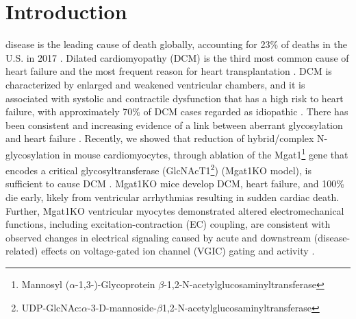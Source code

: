 \documentclass[journal]{IEEEtran}
\begin{document}
%
\IEEEpeerreviewmaketitle

\section{Introduction}
 disease is the leading cause of death globally, accounting for 23\% of deaths in the U.S. in 2017 \cite{cdc2019deaths}. Dilated cardiomyopathy (DCM) is the third most common cause of heart failure and the most frequent reason for heart transplantation \cite{weintraub2017dilated}. DCM is characterized by enlarged and weakened ventricular chambers, and it is associated with systolic and contractile dysfunction that has a high risk to heart failure, with approximately 70\% of DCM cases regarded as idiopathic \cite{weintraub2017dilated, lakdawala2013dilated, hershberger2011update}. There has been consistent and increasing evidence of a link between aberrant glycosylation and heart failure \cite{gehrmann2003cardiomyopathy, footitt2009cardiomyopathy, marques2017cardiac}. Recently, we showed that reduction of hybrid/complex N-glycosylation in mouse cardiomyocytes, through ablation of the Mgat1\footnote{Mannosyl ($\alpha$-1,3-)-Glycoprotein $\beta$-1,2-N-acetylglucosaminyltransferase} gene that encodes a critical glycosyltransferase (GlcNAcT1\footnote{UDP-GlcNAc:$\alpha$-3-D-mannoside-$\beta$1,2-N-acetylglucosaminyltransferase}) (Mgat1KO model), is sufficient to cause DCM \cite{ednie2019reduced, ednie2019reduced2}. Mgat1KO mice develop DCM, heart failure, and 100\% die early, likely from ventricular arrhythmias resulting in sudden cardiac death. Further, Mgat1KO ventricular myocytes demonstrated altered electromechanical functions, including excitation-contraction (EC) coupling, are consistent with observed changes in electrical signaling caused by acute and downstream (disease-related) effects on voltage-gated ion channel (VGIC) gating and activity \cite{ednie2019reduced}. 
\end{document}
